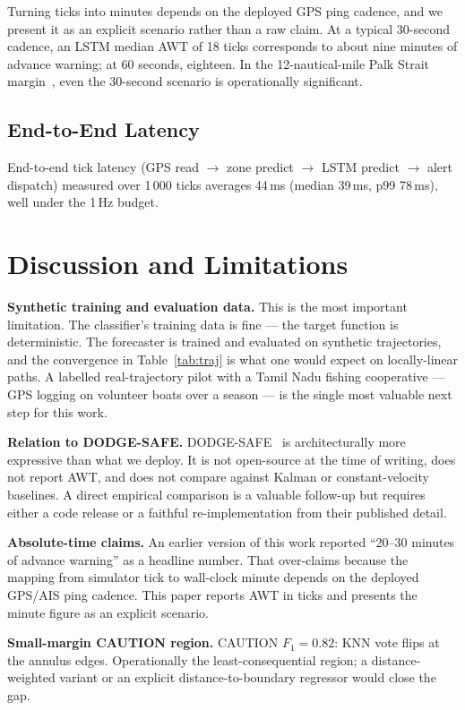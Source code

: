 \documentclass[conference]{IEEEtran}
\begin{document}
Turning ticks into minutes depends on the deployed GPS ping cadence, and we present it as an explicit scenario rather than a raw claim. At a typical 30-second cadence, an LSTM median AWT of 18 ticks corresponds to about nine minutes of advance warning; at 60 seconds, eighteen. In the 12-nautical-mile Palk Strait margin~\cite{iar2024}, even the 30-second scenario is operationally significant.

\subsection{End-to-End Latency}

End-to-end tick latency (GPS read $\to$ zone predict $\to$ LSTM predict $\to$ alert dispatch) measured over 1\,000 ticks averages 44\,ms (median 39\,ms, p99 78\,ms), well under the 1\,Hz budget.

\section{Discussion and Limitations}\label{sec:discussion}

\textbf{Synthetic training and evaluation data.} This is the most important limitation. The classifier's training data is fine --- the target function is deterministic. The forecaster is trained and evaluated on synthetic trajectories, and the convergence in Table~\ref{tab:traj} is what one would expect on locally-linear paths. A labelled real-trajectory pilot with a Tamil Nadu fishing cooperative --- GPS logging on volunteer boats over a season --- is the single most valuable next step for this work.

\textbf{Relation to DODGE-SAFE.} DODGE-SAFE~\cite{dodgesafe2025} is architecturally more expressive than what we deploy. It is not open-source at the time of writing, does not report AWT, and does not compare against Kalman or constant-velocity baselines. A direct empirical comparison is a valuable follow-up but requires either a code release or a faithful re-implementation from their published detail.

\textbf{Absolute-time claims.} An earlier version of this work reported ``20--30 minutes of advance warning'' as a headline number. That over-claims because the mapping from simulator tick to wall-clock minute depends on the deployed GPS/AIS ping cadence. This paper reports AWT in ticks and presents the minute figure as an explicit scenario.

\textbf{Small-margin CAUTION region.} CAUTION $F_1 = 0.82$: KNN vote flips at the annulus edges. Operationally the least-consequential region; a distance-weighted variant or an explicit distance-to-boundary regressor would close the gap.
\end{document}
